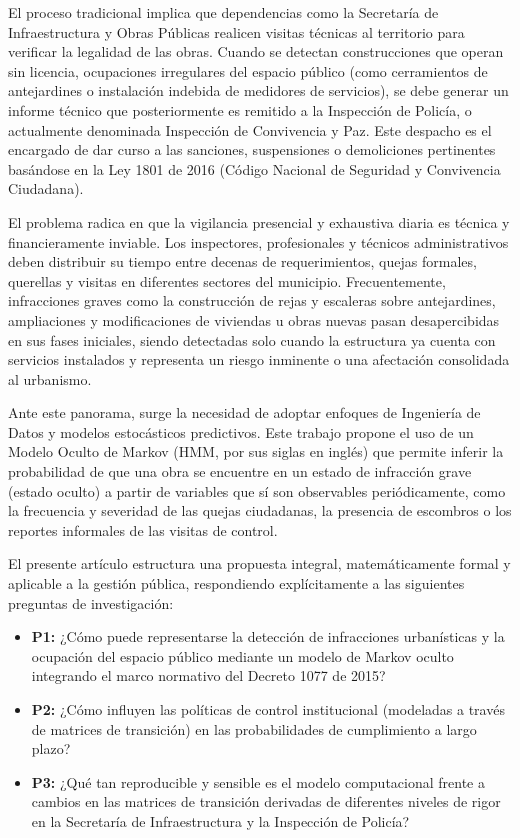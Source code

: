 \documentclass[12pt,letterpaper]{article}
\begin{document}
El proceso tradicional implica que dependencias como la Secretaría de Infraestructura y Obras Públicas realicen visitas técnicas al territorio para verificar la legalidad de las obras. Cuando se detectan construcciones que operan sin licencia, ocupaciones irregulares del espacio público (como cerramientos de antejardines o instalación indebida de medidores de servicios), se debe generar un informe técnico que posteriormente es remitido a la Inspección de Policía, o actualmente denominada Inspección de Convivencia y Paz. Este despacho es el encargado de dar curso a las sanciones, suspensiones o demoliciones pertinentes basándose en la Ley 1801 de 2016 (Código Nacional de Seguridad y Convivencia Ciudadana). 

El problema radica en que la vigilancia presencial y exhaustiva diaria es técnica y financieramente inviable. Los inspectores, profesionales y técnicos administrativos deben distribuir su tiempo entre decenas de requerimientos, quejas formales, querellas y visitas en diferentes sectores del municipio. Frecuentemente, infracciones graves como la construcción de rejas y escaleras sobre antejardines, ampliaciones y modificaciones de viviendas u obras nuevas pasan desapercibidas en sus fases iniciales, siendo detectadas solo cuando la estructura ya cuenta con servicios instalados y representa un riesgo inminente o una afectación consolidada al urbanismo.

Ante este panorama, surge la necesidad de adoptar enfoques de Ingeniería de Datos y modelos estocásticos predictivos. Este trabajo propone el uso de un Modelo Oculto de Markov (HMM, por sus siglas en inglés) que permite inferir la probabilidad de que una obra se encuentre en un estado de infracción grave (estado oculto) a partir de variables que sí son observables periódicamente, como la frecuencia y severidad de las quejas ciudadanas, la presencia de escombros o los reportes informales de las visitas de control. 

El presente artículo estructura una propuesta integral, matemáticamente formal y aplicable a la gestión pública, respondiendo explícitamente a las siguientes preguntas de investigación:
\begin{itemize}
    \item \textbf{P1:} ¿Cómo puede representarse la detección de infracciones urbanísticas y la ocupación del espacio público mediante un modelo de Markov oculto integrando el marco normativo del Decreto 1077 de 2015?
    \item \textbf{P2:} ¿Cómo influyen las políticas de control institucional (modeladas a través de matrices de transición) en las probabilidades de cumplimiento a largo plazo?
    \item \textbf{P3:} ¿Qué tan reproducible y sensible es el modelo computacional frente a cambios en las matrices de transición derivadas de diferentes niveles de rigor en la Secretaría de Infraestructura y la Inspección de Policía?
\end{itemize}
\end{document}
